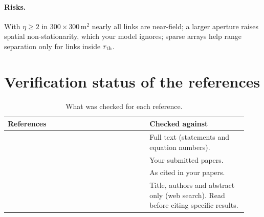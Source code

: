 \documentclass[11pt]{article}
\begin{document}
\paragraph{Risks.} With $\eta\ge2$ in $300\times300$\,m$^2$ nearly all links are near-field; a larger aperture raises spatial non-stationarity, which your model ignores; sparse arrays help range separation only for links inside $r_{\rm th}$.

\section*{Verification status of the references}
\begin{table}[h]
\centering
\caption{What was checked for each reference.}
\label{tab:verify}
\begin{tabular}{@{}p{0.55\linewidth}p{0.38\linewidth}@{}}
\toprule
\textbf{References} & \textbf{Checked against}\\
\midrule
\cite{bjornson2021primer,chen2025exploring,chen2024nearfield,zhou2025sparse,wang2024sparsemimo,hussain2026thinning,li2023modular,kosasih2025mla,wang2026combining} & Full text (statements and equation numbers).\\
\cite{haider2026icassp,haider2026vtc} & Your submitted papers.\\
\cite{cui2022channel,lu2024tutorial,haider2026wcl} & As cited in your papers.\\
\cite{li2024sparseisac,lei2026activity,lei2023uplink,mylonopoulos2025los,xie2025beamfocusing,wei2022hybrid,wang2024xltutorial,stutz2026boundaries,moffet1968mra,pal2010nested,vaidyanathan2011coprime} & Title, authors and abstract only (web search). Read before citing specific results.\\
\bottomrule
\end{tabular}
\end{table}
\end{document}
